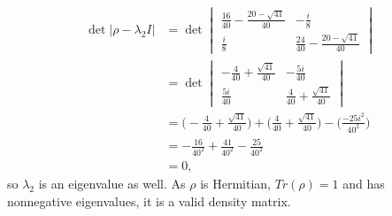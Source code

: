 \documentclass[10pt]{article}
\begin{document}
\begin{align*}
\det |\rho - \lambda_2 I| &= \det
   \begin{vmatrix}
   \frac{16}{40} - \frac{20 - \sqrt{41}}{40} & -\frac{i}{8} \\
   \frac{i}{8}  &  \frac{24}{40} - \frac{20 - \sqrt{41}}{40}
   \end{vmatrix} \\
   &= \det
   \begin{vmatrix}
   -\frac{4}{40} + \frac{\sqrt{41}}{40} & -\frac{5i}{40} \\
   \frac{5i}{40}  &  \frac{4}{40} + \frac{\sqrt{41}}{40} 
   \end{vmatrix} \\
   &= \Bigg( -\frac{4}{40} + \frac{\sqrt{41}}{40} \Bigg) + \Bigg( \frac{4}{40} + \frac{\sqrt{41}}{40} \Bigg) - \Bigg( \frac{-25i^2}{40^2} \Bigg) \\
   &= -\frac{16}{40^2} + \frac{41}{40^2} - \frac{25}{40^2} \\
   &= 0,
\end{align*}
so $\lambda_2$ is an eigenvalue as well. As $\rho$ is Hermitian, $Tr(\rho) = 1$ and has nonnegative eigenvalues, it is a valid density matrix.
\end{document}
